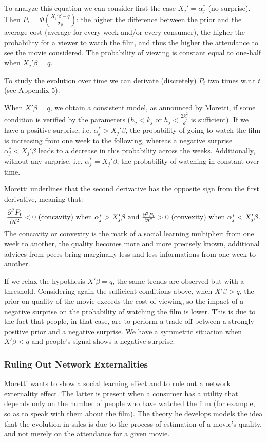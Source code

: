 	To analyze this equation we can consider first the case $X_{j}'=\alpha_{j}^{*}$ (no surprise). Then $P_{t}=\Phi\left(\frac{X_{j}'\beta-q}{\sigma_{j t}}\right)$: the higher the difference between the prior and the average cost (average for every week and/or every consumer), the higher the probability for a viewer to watch the film, and thus the higher the attendance to see the movie considered. The probability of viewing is constant equal to one-half when $X_{j}'\beta=q$.

	To study the evolution over time we can derivate (discretely) $P_{t}$ two times w.r.t $t$ (see Appendix 5).

		When $X'\beta=q$, we obtain a consistent model, as announced by Moretti, if some condition is verified by the parameters ($h_{j}<k_{j}$ or $h_{j}<\frac{2k_{j}^{2}}{d}$ is sufficient).
		If we have a positive surprise, i.e. $\alpha_{j}^{*}>X_{j}'\beta$, the probability of going to watch the film is increasing from one week to the following, whereas a negative surprise $\alpha_{j}^{*}<X_{j}'\beta$ leads to a decrease in this probability across the weeks. Additionally, without any surprise, i.e. $\alpha_{j}^{*}=X_{j}'\beta$, the probability of watching in constant over time.

	Moretti underlines that the second derivative has the opposite sign from the first derivative, meaning that:
	\begin{equation*}
		\frac{\partial ^{2} P_{t}}{\partial t^{2}}<0$ (concavity) when $\alpha_{j}^{*}>X_{j}'\beta$ and $\frac{\partial ^{2} P_{t}}{\partial t^{2}}>0$ (convexity) when $\alpha_{j}^{*}<X_{j}'\beta.
	\end{equation*}
	The concavity or convexity is the mark of a social learning multiplier: from one week to another, the quality becomes more and more precisely known, additional advices from peers bring marginally less and less informations from one week to another.

	If we relax the hypothesis $X'\beta=q$, the same trends are observed but with a threshold. Considering again the sufficient conditions above, when $X'\beta>q$, the prior on quality of the movie exceeds the cost of viewing, so the impact of a negative surprise on the probability of watching the film is lower. This is due to the fact that people, in that case, are to perform a trade-off between a strongly positive prior and a negative surprise. We have a symmetric situation when $X'\beta<q$ and people's signal shows a negative surprise.
	
	\subsubsection{Ruling Out Network Externalities}

	Moretti wants to show a social learning effect and to rule out a network externality effect. The latter is present when a consumer has a utility that depends only on the number of people who have watched the film (for example, so as to speak with them about the film). The theory he develops models the idea that the evolution in sales is due to the process of estimation of a movie's quality, and not merely on the attendance for a given movie.
